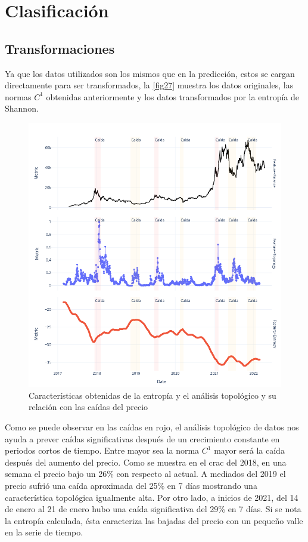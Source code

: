 \section{Clasificación}
\label{res_clasificacion}

\subsection{Transformaciones}
Ya que los datos utilizados son los mismos que en la predicción, estos se cargan directamente para ser transformados, la \autoref{fig27} muestra los datos originales, las normas $C^1$ obtenidas anteriormente y los datos transformados por la entropía de Shannon. 

\begin{figure}[h!]
	\centering
	\includegraphics[scale=0.55]{Chapter5/clasifica_transf.png}
	\caption{Características obtenidas de la entropía y el análisis topológico y su relación con las caídas del precio}
	\label{fig27}
\end{figure}
\vspace{1cm}
Como se puede observar en las caídas en rojo, el análisis topológico de datos nos ayuda a prever caídas significativas después de un crecimiento constante en periodos cortos de tiempo. Entre mayor sea la norma $C^1$ mayor será la caída después del aumento del precio. Como se muestra en el crac del 2018, en una semana el precio bajo un 26\% con respecto al actual. A mediados del 2019 el precio sufrió una caída aproximada del 25\% en 7 días mostrando una característica topológica igualmente alta. Por otro lado, a inicios de 2021, del 14 de enero al 21 de enero hubo una caída significativa del 29\% en 7 días. Si se nota la entropía calculada, ésta caracteriza las bajadas del precio con un pequeño valle en la serie de tiempo.

